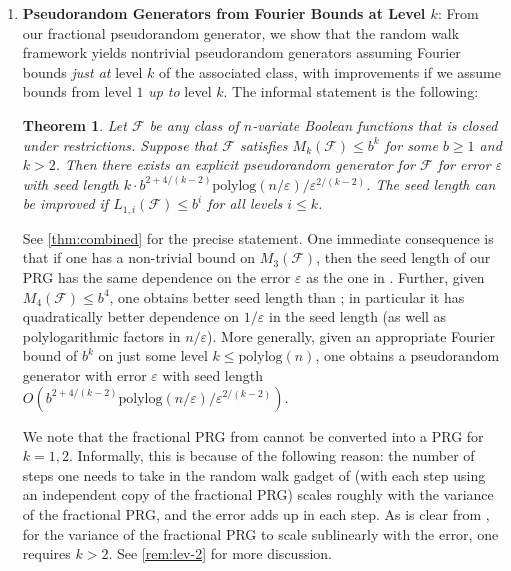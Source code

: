 \documentclass[10pt,a4paper]{article}
\newcommand{\eps}{\varepsilon}
\newtheorem{THM}[theorem]{Theorem}
\theoremstyle{definition}
\begin{document}
\begin{enumerate}
\item \textbf{Pseudorandom Generators from Fourier Bounds at Level $k$}: From our fractional pseudorandom generator, we show that the random walk framework yields nontrivial pseudorandom generators assuming Fourier bounds \emph{just at} level $k$ of the associated class, with improvements if we assume bounds from level $1$ \emph{up to} level $k$. The informal statement is the following:

\begin{THM}
\label{thm:levelkprg}
Let $\mathcal{F}$ be any class of $n$-variate Boolean functions that is closed under restrictions. Suppose that $\mathcal{F}$ satisfies $M_{k}(\mathcal{F})\leq b^{k}$ for some  $b\geq 1$ and  $k>2$. Then there exists an explicit pseudorandom generator for $\mathcal{F}$  for error $\eps$ with seed length $k\cdot b^{2+4/(k-2)}\mathrm{polylog}(n/\eps)/\eps^{2/(k-2)}$. The seed length can be improved if $L_{1,i}(\mathcal{F}) \le b^i$ for all levels $i \le k$.
\end{THM}

 See \cref{thm:combined} for the precise statement. One immediate consequence is that if one has a non-trivial bound on $M_3(\mathcal{F})$, then the seed length of our PRG has the same dependence on the error $\eps$ as the one in \cite{CHLT}.  Further, given $M_4(\mathcal{F}) \le b^4$, one obtains better seed length than \cite{CHLT}; in particular it has quadratically better dependence on $1/\eps$ in the seed length (as well as polylogarithmic factors in $n/\eps$).  More generally, given an appropriate Fourier bound of $b^k$ on just some level $k\leq \mathrm{polylog}(n)$, one obtains a pseudorandom generator with error $\eps$ with seed length $O(b^{2+4/(k-2)}\mathrm{polylog}(n/\eps)/\eps^{2/(k-2)})$. 
 
We note that the fractional PRG from  cannot be converted into a PRG for $k=1,2$. Informally, this is because of the following reason: the number of steps one needs to take in the random walk gadget of \cite{CHHL} (with each step using an independent copy of the fractional PRG) scales roughly with the variance of the fractional PRG, and the error adds up in each step.  As is clear from , for the variance of the fractional PRG to scale sublinearly with the error, one requires $k>2$. See \cref{rem:lev-2} for more discussion. 



\end{enumerate}
\end{document}
